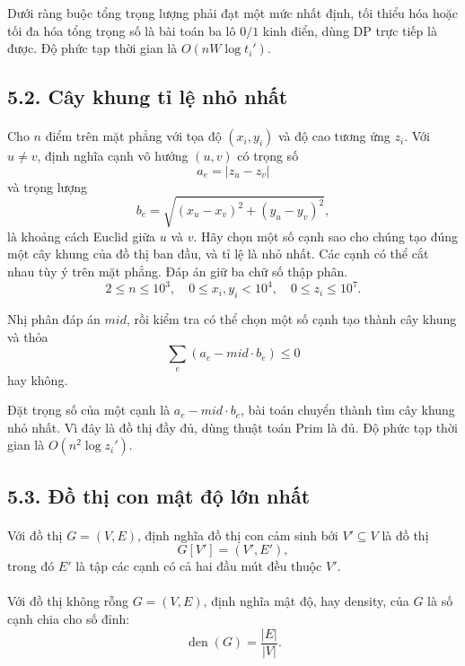 \documentclass[11pt]{article}
\begin{document}
Dưới ràng buộc tổng trọng lượng phải đạt một mức nhất định, tối thiểu hóa hoặc
tối đa hóa tổng trọng số là bài toán ba lô \(0/1\) kinh điển, dùng DP trực
tiếp là được. Độ phức tạp thời gian là \(O(nW\log t_i')\).

\subsection*{5.2. Cây khung tỉ lệ nhỏ nhất}

\paragraph{}
Cho \(n\) điểm trên mặt phẳng với tọa độ \((x_i,y_i)\) và độ cao tương ứng
\(z_i\). Với \(u\ne v\), định nghĩa cạnh vô hướng \((u,v)\) có trọng số
\[
  a_e=|z_u-z_v|
\]
và trọng lượng
\[
  b_e=\sqrt{(x_u-x_v)^2+(y_u-y_v)^2},
\]
là khoảng cách Euclid giữa \(u\) và \(v\). Hãy chọn một số cạnh sao cho chúng
tạo đúng một cây khung của đồ thị ban đầu, và tỉ lệ là nhỏ nhất. Các cạnh có
thể cắt nhau tùy ý trên mặt phẳng. Đáp án giữ ba chữ số thập phân.
\[
  2\le n\le10^3,\quad
  0\le x_i,y_i<10^4,\quad
  0\le z_i\le10^7.
\]

Nhị phân đáp án \(\mathit{mid}\), rồi kiểm tra có thể chọn một số cạnh tạo
thành cây khung và thỏa
\[
  \sum_e(a_e-\mathit{mid}\cdot b_e)\le0
\]
hay không.

Đặt trọng số của một cạnh là \(a_e-\mathit{mid}\cdot b_e\), bài toán chuyển
thành tìm cây khung nhỏ nhất. Vì đây là đồ thị đầy đủ, dùng thuật toán Prim là
đủ. Độ phức tạp thời gian là \(O(n^2\log z_i')\).

\subsection*{5.3. Đồ thị con mật độ lớn nhất}

\paragraph{}
Với đồ thị \(G=(V,E)\), định nghĩa đồ thị con cảm sinh bởi \(V'\subseteq V\)
là đồ thị
\[
  G[V']=(V',E'),
\]
trong đó \(E'\) là tập các cạnh có cả hai đầu mút đều thuộc \(V'\).

\paragraph{}
Với đồ thị không rỗng \(G=(V,E)\), định nghĩa mật độ, hay density, của \(G\) là
số cạnh chia cho số đỉnh:
\[
  \operatorname{den}(G)=\frac{|E|}{|V|}.
\]
\end{document}
